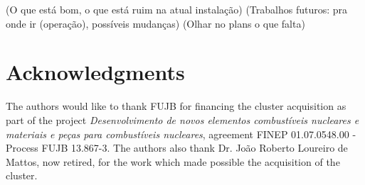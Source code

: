 \documentclass[twoside,a4paper,12pt,english]{inac19}
\begin{document}
(O que está bom, o que está ruim na atual instalação)
(Trabalhos futuros: pra onde ir (operação), possíveis mudanças)
(Olhar no plans o que falta)






\section*{Acknowledgments}
The authors would like to thank FUJB for financing the cluster acquisition
as part of the project \textit{Desenvolvimento de novos elementos combust\'{i}veis nucleares
  e materiais e pe\c{c}as para combust\'{i}veis nucleares}, agreement FINEP 01.07.0548.00 - Process FUJB 13.867-3.
The authors also thank Dr. Jo\~{a}o Roberto Loureiro de Mattos, now retired, for the work which made possible the acquisition of the cluster.

\end{document}
